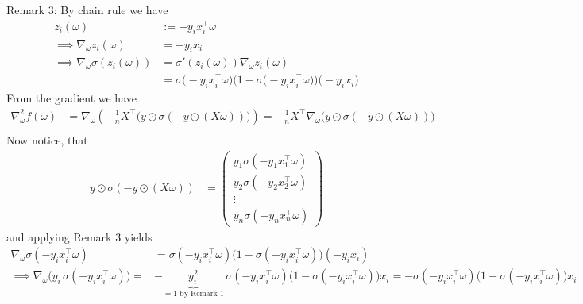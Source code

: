 \documentclass{article}
\begin{document}
Remark 3: By chain rule we have
\begin{align*}
z_i(\omega) &:= -y_i x_i^\top \omega \\
\implies \nabla_\omega z_i(\omega) &= -y_i x_i \\
\implies \nabla_\omega \sigma(z_i(\omega)) 
&= \sigma'(z_i(\omega)) \nabla_\omega z_i(\omega) \\
&= \sigma\bigl(-y_i x_i^\top \omega\bigr)\bigl(1 - \sigma\bigl(-y_i x_i^\top \omega\bigr)\bigr)\bigl(-y_i x_i\bigr)
\end{align*}
%
From the gradient we have
\begin{align*}
\nabla^2_\omega f(\omega) 
&= \nabla_\omega \left( -\frac{1}{n} X^\top \big(y \odot \sigma(-y \odot (X\omega))\big) \right) = -\frac{1}{n} X^\top \nabla_\omega \big(y \odot \sigma(-y \odot (X\omega))\big) \\
%
\end{align*}
Now notice, that
\begin{align*}
y \odot \sigma(-y \odot (X\omega)) &= \begin{pmatrix}
y_1 \sigma(-y_1 x_1^\top \omega) \\
y_2 \sigma(-y_2 x_2^\top \omega) \\
\vdots \\
y_n \sigma(-y_n x_n^\top \omega)
\end{pmatrix}
\end{align*}
and applying Remark 3 yields 
\begin{align*}
\nabla_\omega \sigma(-y_i x_i^\top \omega) 
&= \sigma(-y_i x_i^\top \omega)\big(1 - \sigma(-y_i x_i^\top \omega)\big)(-y_i x_i) \\
%
\implies \nabla_\omega \big(y_i \, \sigma(-y_i x_i^\top \omega)\big) 
=& -\underbrace{y_i^2}_{=1 \text{ by Remark 1}} \, \sigma(-y_i x_i^\top \omega)\big(1 - \sigma(-y_i x_i^\top \omega)\big) x_i 
=- \sigma(-y_i x_i^\top \omega)\big(1 - \sigma(-y_i x_i^\top \omega)\big) x_i \\
%
\end{align*}
%
\end{document}
